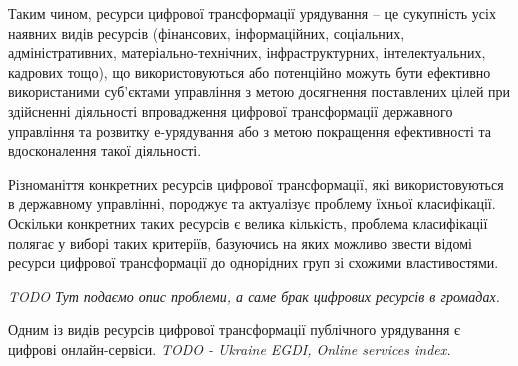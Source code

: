Таким чином, ресурси цифрової трансформації урядування -- це сукупність усіх наявних видів ресурсів (фінансових, інформаційних, соціальних, адміністративних, матеріально-технічних, інфраструктурних, інтелектуальних, кадрових тощо), що використовуються або потенційно можуть бути ефективно використаними суб'єктами управління з метою досягнення поставлених цілей при здійсненні діяльності впровадження цифрової трансформації державного управління та розвитку е-урядування або з метою покращення ефективності та вдосконалення такої діяльності.

Різноманіття конкретних ресурсів цифрової трансформації, які використовуються в державному управлінні, породжує та актуалізує проблему їхньої класифікації. Оскільки конкретних таких ресурсів є велика кількість, проблема класифікації полягає у виборі таких критеріїв, базуючись на яких можливо звести відомі ресурси цифрової трансформації до однорідних груп зі схожими властивостями.

\textit{TODO Тут подаємо опис проблеми, а саме брак цифрових ресурсів в громадах.}

Одним із видів ресурсів цифрової трансформації публічного урядування є цифрові онлайн-сервіси. \textit{TODO - Ukraine EGDI, Online services index.}